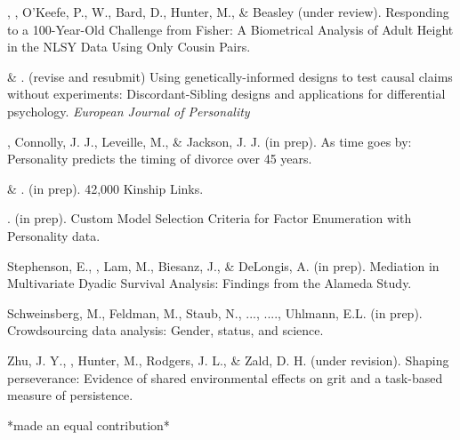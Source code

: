\item\Joe, \meb, O'Keefe, P., W., Bard, D., Hunter, M., \& Beasley (under review). Responding to a 100-Year-Old Challenge from Fisher: A Biometrical Analysis of Adult Height in the NLSY Data Using Only Cousin Pairs.
\item \meb \& \joe. (revise and resubmit) Using genetically-informed designs to test causal claims without experiments: Discordant-Sibling designs and applications for differential psychology. \textit{European Journal of Personality}  \href{https://osf.io/zpdwt/}{\color{blue}{https://osf.io/zpdwt/}}
\item\meb, Connolly, J. J., Leveille, M., \& Jackson, J. J. (in prep). As time goes by: Personality predicts the timing of divorce over 45 years.%
\item \meb \& \joe.  (in prep). 42,000 Kinship Links.
\item \meb. (in prep). Custom Model Selection Criteria for Factor Enumeration with Personality data.
\item Stephenson, E., \meb, Lam, M., Biesanz, J., \& DeLongis, A. (in prep). Mediation in Multivariate Dyadic Survival Analysis: Findings from the Alameda Study. %
\item Schweinsberg, M., Feldman, M., Staub, N., ..., \meb ...., Uhlmann, E.L. (in prep). Crowdsourcing data analysis: Gender, status, and science. 
\item Zhu, J. Y., \meb, Hunter, M., Rodgers, J. L., \& Zald, D. H. (under revision). Shaping perseverance: Evidence of shared environmental effects on grit and a task-based measure of persistence. %
\vspace{-2mm}\begin{center}\footnotesize{*made an equal contribution*}\end{center} \vspace{-3mm}
\vspace{-2mm}\begin{center}\end{center} \vspace{-4mm}
